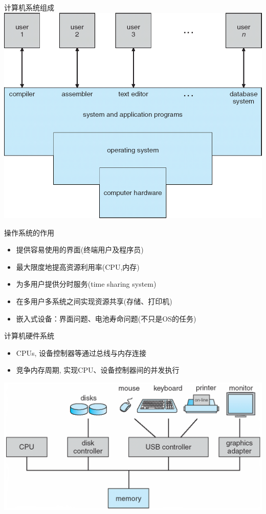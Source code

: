 \documentclass[xcolor=svgnames]{beamer}
\begin{document}
\begin{CJK*}{UTF8}{gbsn}
\begin{frame}{计算机系统组成}
\includegraphics[width=.9\textwidth]{system.png}
\end{frame}

\begin{frame}{操作系统的作用}
\begin{itemize}
\item 提供容易使用的界面(终端用户及程序员)
\item 最大限度地提高资源利用率(CPU,内存)
\item 为多用户提供分时服务(time sharing system)
\item 在多用户多系统之间实现资源共享(存储、打印机)
\item 嵌入式设备：界面问题、电池寿命问题(不只是OS的任务)
\end{itemize}
\end{frame}

\begin{frame}{计算机硬件系统}
\begin{itemize}
\item CPUs, 设备控制器等通过总线与内存连接
\item 竞争内存周期, 实现CPU、设备控制器间的并发执行
\end{itemize}
\includegraphics[width=1.0\textwidth]{org.png}
\end{frame}


\end{CJK*}
\end{document}

